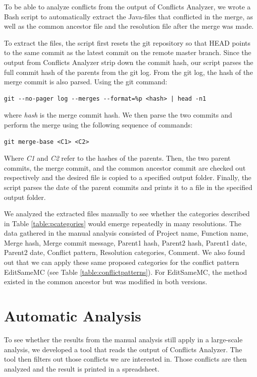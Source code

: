 To be able to analyze conflicts from the output of Conflicts Analyzer, we wrote a Bash script to automatically extract the Java-files that conflicted in the merge, as well as the common ancestor file and the resolution file after the merge was made.

To extract the files, the script first resets the git repository so that HEAD points to the same commit as the latest commit on the remote master branch. Since the output from Conflicts Analyzer strip down the commit hash, our script parses the full commit hash of the parents from the git log. From the git log, the hash of the merge commit is also parsed. Using the git command:
\lstset{language=Bash,numbers=left,xleftmargin=2em,frame=single,framexleftmargin=1.5em}
\begin{lstlisting}[frame=single,breaklines=true,tabsize=2]
git --no-pager log --merges --format=%p <hash> | head -n1
\end{lstlisting}
where \textit{hash} is the merge commit hash. We then parse the two commits and perform the merge using the following sequence of commands:\\
\lstset{language=Bash,numbers=left,xleftmargin=2em,frame=single,framexleftmargin=1.5em}
\begin{lstlisting}[frame=single,breaklines=true,tabsize=2]
git merge-base <C1> <C2>
\end{lstlisting}
Where \textit{C1} and \textit{C2} refer to the hashes of the parents.  Then, the two parent commits, the merge commit, and the common ancestor commit are checked out respectively and the desired file is copied to a specified output folder. Finally, the script parses the date of the parent commits and prints it to a file in the specified output folder.

We analyzed the extracted files manually to see whether the categories described in Table \ref{table:pcategories} would emerge repeatedly in many resolutions. The data gathered in the manual analysis consisted of Project name, Function name, Merge hash, Merge commit message, Parent1 hash, Parent2 hash, Parent1 date, Parent2 date, Conflict pattern, Resolution categories, Comment. We also found out that we can apply these same proposed categories for the conflict pattern EditSameMC (see Table \ref{table:conflictpatterns}). For EditSameMC, the method existed in the common ancestor but was modified in both versions.
\FloatBarrier
\section{Automatic Analysis}
To see whether the results from the manual analysis still apply in a large-scale analysis, we developed a tool that reads the output of Conflicts Analyzer. The tool then filters out those conflicts we are interested in. Those conflicts are then analyzed and the result is printed in a spreadsheet.

